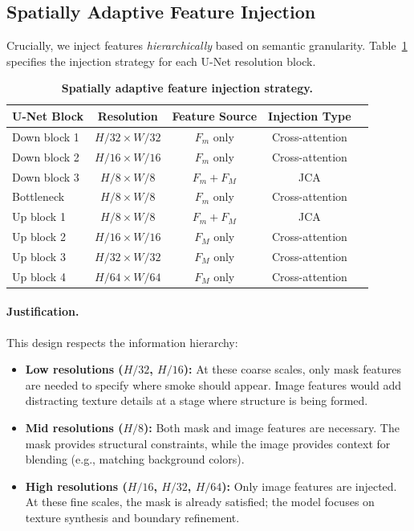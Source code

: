 \documentclass[journal]{IEEEtran}
\begin{document}
\subsection{Spatially Adaptive Feature Injection}

Crucially, we inject features \emph{hierarchically} based on semantic granularity. Table~\ref{tab:injection} specifies the injection strategy for each U-Net resolution block.

\begin{table}[t]
\centering
\caption{\textbf{Spatially adaptive feature injection strategy.}}
\label{tab:injection}
\begin{tabular}{lcccc}
\toprule
U-Net Block & Resolution & Feature Source & Injection Type \\
\midrule
Down block 1 & $H/32 \times W/32$ & $F_m$ only & Cross-attention \\
Down block 2 & $H/16 \times W/16$ & $F_m$ only & Cross-attention \\
Down block 3 & $H/8 \times W/8$ & $F_m + F_M$ & JCA \\
Bottleneck & $H/8 \times W/8$ & $F_m$ only & Cross-attention \\
Up block 1 & $H/8 \times W/8$ & $F_m + F_M$ & JCA \\
Up block 2 & $H/16 \times W/16$ & $F_M$ only & Cross-attention \\
Up block 3 & $H/32 \times W/32$ & $F_M$ only & Cross-attention \\
Up block 4 & $H/64 \times W/64$ & $F_M$ only & Cross-attention \\
\bottomrule
\end{tabular}
\end{table}

\paragraph{Justification.}
This design respects the information hierarchy:
\begin{itemize}
    \item \textbf{Low resolutions ($H/32$, $H/16$):} At these coarse scales, only mask features are needed to specify where smoke should appear. Image features would add distracting texture details at a stage where structure is being formed.
    \item \textbf{Mid resolutions ($H/8$):} Both mask and image features are necessary. The mask provides structural constraints, while the image provides context for blending (e.g., matching background colors).
    \item \textbf{High resolutions ($H/16$, $H/32$, $H/64$):} Only image features are injected. At these fine scales, the mask is already satisfied; the model focuses on texture synthesis and boundary refinement.
\end{itemize}
\end{document}
